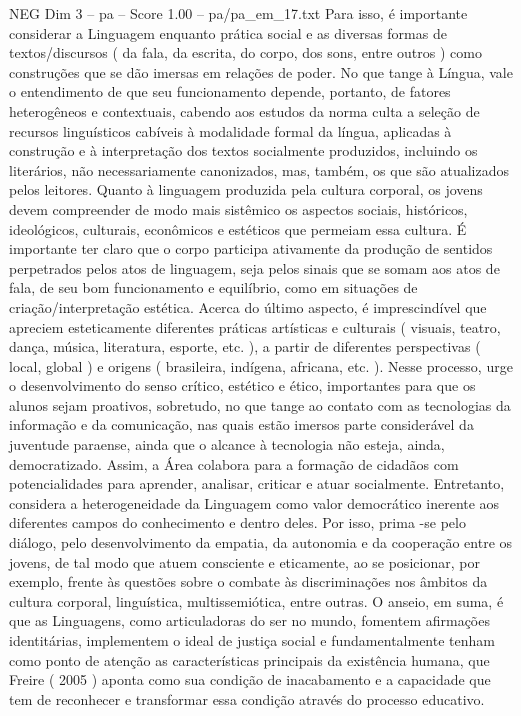 \begin{textsample}{NEG Dim 3 – pa – Score 1.00 – pa/pa\_em\_17.txt}  \label{ex:f3_neg_058}
Para isso, é importante considerar a Linguagem enquanto prática social e as diversas formas de textos/discursos ( da fala, da escrita, do corpo, dos sons, entre outros ) como construções que se dão imersas em relações de poder.
No que tange à Língua, vale o entendimento de que seu funcionamento depende, portanto, de fatores heterogêneos e contextuais, cabendo aos estudos da norma culta a seleção de recursos linguísticos cabíveis à modalidade formal da língua, aplicadas à construção e à interpretação dos textos socialmente produzidos, incluindo os literários, não necessariamente canonizados, mas, também, os que são atualizados pelos leitores.
Quanto à linguagem produzida pela cultura corporal, os jovens devem compreender de modo mais sistêmico os aspectos sociais, históricos, ideológicos, culturais, econômicos e estéticos que permeiam essa cultura.
É importante ter claro que o corpo participa ativamente da produção de sentidos perpetrados pelos atos de linguagem, seja pelos sinais que se somam aos atos de fala, de seu bom funcionamento e equilíbrio, como em situações de criação/interpretação estética.
Acerca do último aspecto, é imprescindível que apreciem esteticamente diferentes práticas artísticas e culturais ( visuais, teatro, dança, música, literatura, esporte, etc. ), a partir de diferentes perspectivas ( local, global ) e origens ( brasileira, indígena, africana, etc. ).
Nesse processo, urge o desenvolvimento do senso crítico, estético e ético, importantes para que os alunos sejam proativos, sobretudo, no que tange ao contato com as tecnologias da informação e da comunicação, nas quais estão imersos parte considerável da juventude paraense, ainda que o alcance à tecnologia não esteja, ainda, democratizado.
Assim, a Área colabora para a formação de cidadãos com potencialidades para aprender, analisar, criticar e atuar socialmente.
Entretanto, considera a heterogeneidade da Linguagem como valor democrático inerente aos diferentes campos do conhecimento e dentro deles.
Por isso, prima -se pelo diálogo, pelo desenvolvimento da empatia, da autonomia e da cooperação entre os jovens, de tal modo que atuem consciente e eticamente, ao se posicionar, por exemplo, frente às questões sobre o combate às discriminações nos âmbitos da cultura corporal, linguística, multissemiótica, entre outras.
O anseio, em suma, é que as Linguagens, como articuladoras do ser no mundo, fomentem afirmações identitárias, implementem o ideal de justiça social e fundamentalmente tenham como ponto de atenção as características principais da existência humana, que Freire ( 2005 ) aponta como sua condição de inacabamento e a capacidade que tem de reconhecer e transformar essa condição através do processo educativo.

\end{textsample}
